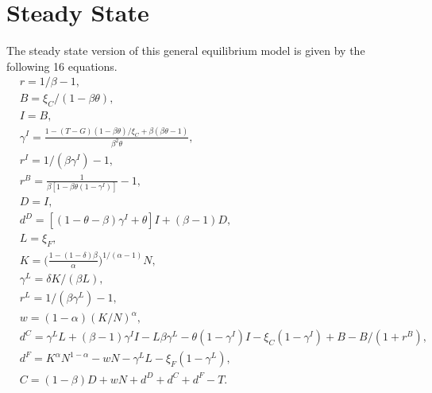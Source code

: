 \documentclass[12pt]{article}
\begin{document}
\section{Steady State}
The steady state version of this general equilibrium model is given by the following 16 equations.
\begin{align}
  &r=1/\beta-1, \\
  &B=\xi_C/(1-\beta \theta), \\
  &I=B,\\
  &\gamma^I=\frac{1-(T-G)(1-\beta \theta)/ \xi_C+\beta (\beta \theta-1)}{\beta^2 \theta},\\
  &r^I=1/(\beta \gamma^I)-1,\\
  &r^B=\frac{1}{\beta[1-\beta \theta(1-\gamma^I)]}-1,\\
  &D=I,\\
  &d^D=[(1-\theta-\beta)\gamma^I+\theta]I+(\beta-1)D,\\
  &L=\xi_F,\\
  &K=\bigg(\frac{1-(1-\delta) \beta} {\alpha}\bigg)^{1/(\alpha-1)}N,\\
  &\gamma^L=\delta K/(\beta L),\\
  &r^L=1/(\beta \gamma ^L)-1, \\
  &w=(1-\alpha)(K/N)^{\alpha},\\
  &d^C=\gamma^L L+(\beta-1)\gamma^I I-L\beta \gamma^L-\theta (1-\gamma^I)I-\xi_C(1-\gamma^I)+B-B/(1+r^B),\\
  &d^F=K^{\alpha}N^{1-\alpha}-wN-\gamma^L L-\xi_F(1-\gamma^L),\\
  &C=(1-\beta)D+wN+d^D+d^C+d^F-T.
\end{align}
\end{document}
